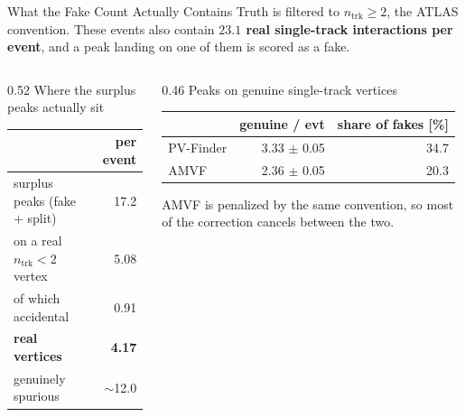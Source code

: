 \documentclass[xcolor=table,aspectratio=169]{beamer}
\newcommand{\ntrk}{\ensuremath{n_\mathrm{trk}}}
\begin{document}
\begin{frame}{What the Fake Count Actually Contains}
    \small
    Truth is filtered to $\ntrk\geq2$, the ATLAS convention. These events also contain
    \textbf{$23.1$ real single-track interactions per event}, and a peak landing on one
    of them is scored as a fake.

    \vspace{2.1em}
    \begin{columns}[t]
        \begin{column}{0.52\linewidth}
            \centering
            \footnotesize\textcolor{black!55}{Where the surplus peaks actually sit}
            \par\vspace{0.45em}
            \footnotesize
            \setlength{\tabcolsep}{6pt}
            \begin{tabular}{l r}
                \toprule
                & per event \\
                \midrule
                surplus peaks (fake $+$ split)       & 17.2\phantom{0} \\
                \quad on a real $\ntrk\!<\!2$ vertex  & \phantom{0}5.08 \\
                \quad\quad of which accidental        & \phantom{0}0.91 \\
                \midrule
                \rowcolor{black!8}
                \textbf{real vertices}                & \textbf{\phantom{0}4.17} \\
                genuinely spurious                    & ${\sim}$12.0\phantom{0} \\
                \bottomrule
            \end{tabular}
        \end{column}
        \begin{column}{0.46\linewidth}
            \centering
            \footnotesize\textcolor{black!55}{Peaks on genuine single-track vertices}
            \par\vspace{0.45em}
            \footnotesize
            \setlength{\tabcolsep}{6pt}
            \begin{tabular}{l rr}
                \toprule
                & genuine / evt & share of fakes [\%] \\
                \midrule
                PV-Finder & 3.33 $\pm$ 0.05 & 34.7 \\
                AMVF      & 2.36 $\pm$ 0.05 & 20.3 \\
                \bottomrule
            \end{tabular}
            \par\vspace{0.8em}
            \raggedright\footnotesize
            AMVF is penalized by the same convention, so most of the correction
            cancels between the two.
        \end{column}
    \end{columns}


\end{frame}
\end{document}

